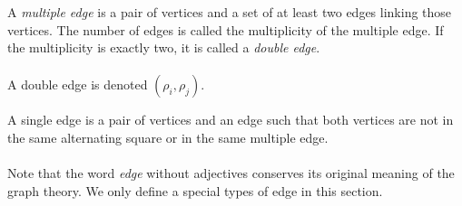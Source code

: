 \begin{definition}

  A \textit{multiple edge} is a pair of vertices and a set of at least two edges linking those vertices. The number of edges is called the multiplicity of the multiple edge. If the multiplicity is exactly two, it is called a \textit{double edge}.

  \begin{figure}[H]
    \begin{center}
      \caption{}
    \end{center}
  \end{figure}

  \paragraph{}
  A double edge is denoted $(\rho_i, \rho_j)$.
\end{definition}

\begin{definition}
  \label{single-edge}
  A single edge is a pair of vertices and an edge such that both vertices are not in the same alternating square or in the same multiple edge.
\end{definition}

\paragraph{}
Note that the word \textit{edge} without adjectives conserves its original meaning of the graph theory. We only define a special types of edge in this section.

